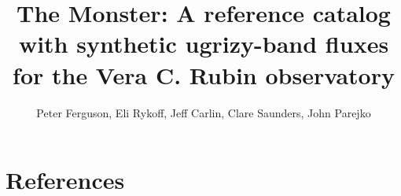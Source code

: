 \documentclass[DM,authoryear,toc]{lsstdoc}
\title{The Monster: A reference catalog with synthetic ugrizy-band fluxes for the Vera C. Rubin observatory}
\author{%
Peter Ferguson,
Eli Rykoff,
Jeff Carlin, 
Clare Saunders, 
John Parejko
}
\date{\vcsDate}
\begin{document}
\linenumbers
\newcommand{\FIXME}[1]{{\bf \textcolor{red}{#1}}}
\maketitle



\clearpage
\appendix
\section{References} \label{sec:bib}
\renewcommand{\refname}{} %


\clearpage


%
\end{document}
